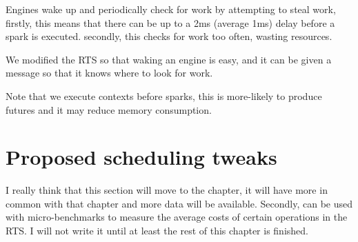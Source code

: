 Engines wake up and periodically check for work by attempting to
steal work,
firstly, this means that there can be up to a 2ms (average 1ms) delay before
a spark is executed.
secondly, this checks for work too often, wasting resources.

We modified the RTS so that waking an engine is easy, and it can be given a
message so that it knows where to look for work.




Note that we execute contexts before sparks,
this is more-likely to produce futures and it may reduce memory consumption.

\section{Proposed scheduling tweaks}
\label{sec:proposed_tweaks}

I really think that this section will move to the \tscope chapter,
it will have more in common with that chapter and more data will be
available.
Secondly, \tscope can be used with micro-benchmarks to measure the
average costs of certain operations in the RTS.
I will not write it until at least the rest of this chapter is finished.

%
%

